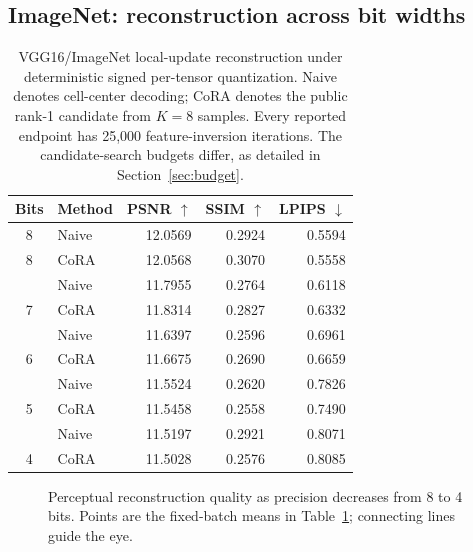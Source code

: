 \documentclass[10pt,twocolumn]{article}
\newcommand{\cora}{CoRA}
\begin{document}
\subsection{ImageNet: reconstruction across bit widths}
\label{sec:bits}
\begin{table}[t]
\centering
\caption{VGG16/ImageNet local-update reconstruction under deterministic
signed per-tensor quantization. Naive denotes cell-center decoding;
\cora{} denotes the public rank-1 candidate from $K=8$ samples.
Every reported endpoint has 25,000 feature-inversion iterations.
The candidate-search budgets differ, as detailed in Section~\ref{sec:budget}.}
\label{tab:bits}
\small
\setlength{\tabcolsep}{4pt}
\begin{tabular}{clrrr}
\toprule
Bits & Method & PSNR $\uparrow$ & SSIM $\uparrow$ & LPIPS $\downarrow$\\
\midrule
8 & Naive & 12.0569 & 0.2924 & 0.5594\\
8 & \cora{} & 12.0568 & 0.3070 & 0.5558\\
\addlinespace
7 & Naive & 11.7955 & 0.2764 & 0.6118\\
7 & \cora{} & 11.8314 & 0.2827 & 0.6332\\
\addlinespace
6 & Naive & 11.6397 & 0.2596 & 0.6961\\
6 & \cora{} & 11.6675 & 0.2690 & 0.6659\\
\addlinespace
5 & Naive & 11.5524 & 0.2620 & 0.7826\\
5 & \cora{} & 11.5458 & 0.2558 & 0.7490\\
\addlinespace
4 & Naive & 11.5197 & 0.2921 & 0.8071\\
4 & \cora{} & 11.5028 & 0.2576 & 0.8085\\
\bottomrule
\end{tabular}
\end{table}

\begin{figure}[t]
\centering
{}
\caption{Perceptual reconstruction quality as precision decreases from
8 to 4 bits. Points are the fixed-batch means in Table~\ref{tab:bits};
connecting lines guide the eye.}
\label{fig:bits}
\end{figure}
\end{document}
